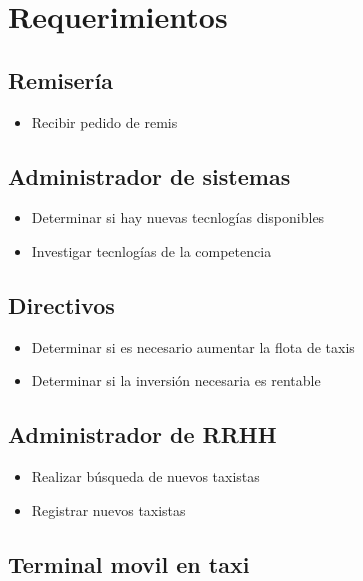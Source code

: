 \documentclass[a4paper]{article}
\begin{document}
\section{Requerimientos}

\subsection{Remiser\'ia}
\begin{itemize}
 \item Recibir pedido de remis
\end{itemize}

\subsection{Administrador de sistemas}
\begin{itemize}
 \item Determinar si hay nuevas tecnlog\'ias disponibles
 \item Investigar tecnlog\'ias de la competencia
 
\end{itemize}



\subsection{Directivos}

\begin{itemize}
 \item Determinar si es necesario aumentar la flota de taxis
 \item Determinar si la inversi\'on necesaria es rentable
\end{itemize}

\subsection{Administrador de RRHH}

\begin{itemize}
 \item Realizar b\'usqueda de nuevos taxistas
 \item Registrar nuevos taxistas
\end{itemize}


\subsection{Terminal movil en taxi}
\end{document}
